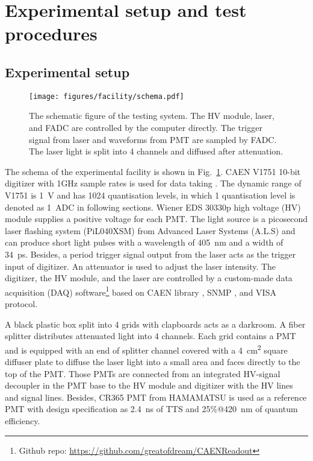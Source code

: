 \section{Experimental setup and test procedures}
\label{SetUp}
\subsection{Experimental setup}
\label{sec:setup}
\begin{figure}[!htbp]
    \centering
    \texttt{[image: figures/facility/schema.pdf]}
    \caption{The schematic figure of the testing system. The HV module, laser, and FADC are controlled by the computer directly. The trigger signal from laser and waveforms from PMT are sampled by FADC. The laser light is split into 4 channels and diffused after attenuation.}
    \label{fig:facility}
\end{figure}

The schema of the experimental facility is shown in Fig.~\ref{fig:facility}. CAEN V1751 10-bit digitizer with 1GHz sample rates is used for data taking \cite{CAENV1751}. The dynamic range of V1751 is \SI{1}{V} and has 1024 quantisation levels, in which 1 quantisation level is denoted as \SI{1}{ADC} \cite{JUNOPrototype} in following sections. Wiener EDS 30330p high voltage (HV) module \cite{WIENERHV} supplies a positive voltage for each PMT. The light source is a picosecond laser flashing system (PiL040XSM) from Advanced Laser Systems (A.L.S) \cite{NTKLaser} and can produce short light pulses with a wavelength of \SI{405}{nm} and a width of \SI{34}{ps}. Besides, a period trigger signal output from the laser acts as the trigger input of digitizer. An attenuator is used to adjust the laser intensity. The digitizer, the HV module, and the laser are controlled by a custom-made data acquisition (DAQ) software\footnote{Github repo: \url{https://github.com/greatofdream/CAENReadout}} based on CAEN library \cite{CAENLIB}, SNMP \cite{SNMP}, and VISA \cite{VISA} protocol.

A black plastic box split into 4 grids with clapboards acts as a darkroom. A fiber splitter distributes attenuated light into 4 channels. Each grid contains a PMT and is equipped with an end of splitter channel covered with a \SI{4}{cm\tothe{2}} square diffuser plate to diffuse the laser light into a small area and faces directly to the top of the PMT. Those PMTs are connected from an integrated HV-signal decoupler in the PMT base to the HV module and digitizer with the HV lines and signal lines. Besides, CR365 PMT \cite{BJBS} from HAMAMATSU is used as a reference PMT with design specification as \SI{2.4}{ns} of TTS and 25\%@\SI{420}{nm} of quantum efficiency.

